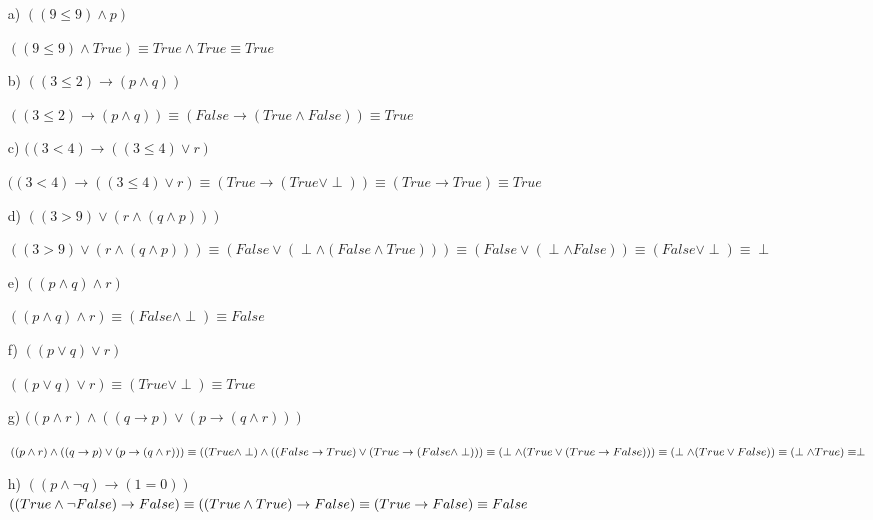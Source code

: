 \documentclass[10pt,a4paper]{article}
\begin{document}
\begin{enumerate}
\item[a)] $((9 \leq 9) \wedge p)$

$((9 \leq 9) \wedge True) \equiv True \wedge True \equiv True$

\item[b)] $((3 \leq 2) \rightarrow (p \wedge q))$

$((3 \leq 2) \rightarrow (p \wedge q)) \equiv (False \rightarrow (True \wedge False)) \equiv True$

\item[c)]$((3 < 4) \rightarrow ((3 \leq 4) \vee r)$

$((3 < 4) \rightarrow ((3 \leq 4) \vee r) \equiv (True \rightarrow (True \vee \perp)) \equiv (True \rightarrow True) \equiv True$

\item[d)] $((3 > 9) \vee (r \wedge (q \wedge p)))$

$((3 > 9) \vee (r \wedge (q \wedge p))) \equiv (False \vee (\perp \wedge (False \wedge True))) \equiv (False \vee (\perp \wedge False)) \equiv (False \vee \perp) \equiv \perp$

\item[e)]$((p \wedge q) \wedge r)$

$((p \wedge q) \wedge r) \equiv (False \wedge \perp) \equiv False$

\item[f)]$((p \vee q) \vee r)$

$((p \vee q) \vee r) \equiv (True \vee \perp) \equiv True$

\item[g)] $((p \wedge r) \wedge ((q \rightarrow p) \vee (p \rightarrow (q \wedge r)))$

$((p \wedge r) \wedge ((q \rightarrow p) \vee (p \rightarrow (q \wedge r)))\equiv \\
((True \wedge \perp) \wedge ((False \rightarrow True) \vee (True \rightarrow (False \wedge \perp)))\equiv \\
(\perp \wedge (True \vee (True \rightarrow False)))\equiv \\
(\perp \wedge (True \vee False))\equiv \\
(\perp \wedge True)\equiv \perp$

\item[h)] $((p \wedge \neg q) \rightarrow (1 = 0))$\\
$((True \wedge \neg False) \rightarrow False)\equiv \\
((True \wedge True) \rightarrow False)\equiv (True \rightarrow False) \equiv False$


\end{enumerate}
\end{document}
